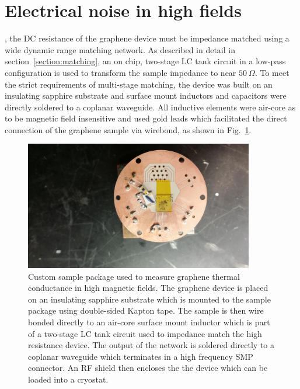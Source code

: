 \section{Electrical noise in high fields}
, the DC resistance of the graphene device must be impedance matched using a wide dynamic range matching network. As described in detail in section~\ref{section:matching}, an on chip, two-stage LC tank circuit in a low-pass configuration is used to transform the sample impedance to near $50~\Omega$. To meet the strict requirements of multi-stage matching, the device was built on an insulating sapphire substrate and surface mount inductors and capacitors were directly soldered to a coplanar waveguide. All inductive elements were air-core as to be magnetic field insensitive and used gold leads which facilitated the direct connection of the graphene sample via wirebond, as shown in Fig.~\ref{fig:m_matching}.
\begin{figure}
\centering
\includegraphics[width=100mm]{figures/magneto/picture_matching_ceramic.jpg}
\caption{Custom sample package used to measure graphene thermal conductance in high magnetic fields. The graphene device is placed on an insulating sapphire substrate which is mounted to the sample package using double-sided Kapton tape. The sample is then wire bonded directly to an air-core surface mount inductor which is part of a two-stage LC tank circuit used to impedance match the high resistance device. The output of the network is soldered directly to a coplanar waveguide which terminates in a high frequency SMP connector. An RF shield then encloses the the device which can be loaded into a cryostat.}
\label{fig:m_matching}
\end{figure}

